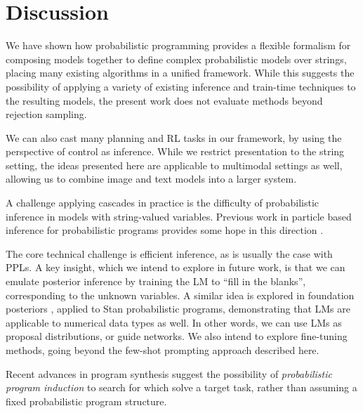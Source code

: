 \section{Discussion}
We have shown how probabilistic programming provides a flexible formalism for composing models together to define complex probabilistic models over strings, placing many existing algorithms in a unified framework. While this suggests the possibility of applying a variety of existing inference and train-time techniques to the resulting models, the present work does not evaluate methods beyond rejection sampling.

We can also cast many planning and RL tasks in our framework, by using the perspective of control as inference.
While we restrict presentation to the string setting, the ideas presented here are applicable to multimodal settings as well, allowing us to combine image and text models into a larger system.

A challenge applying cascades in practice is the difficulty of probabilistic inference in models with string-valued variables. Previous work in particle based inference for probabilistic programs provides some hope in this direction \citep{anglican}.

The core technical challenge is efficient inference, 
as is usually the case with PPLs. A key insight, which we intend
to explore in future work, is that we can emulate posterior
inference by training the LM 
to ``fill in the blanks'', corresponding to the unknown variables.
A similar idea is explored in 
foundation posteriors \citep{foundationposterior}, applied to Stan probabilistic programs, demonstrating that LMs are applicable to numerical data types as well.
In other words, we can use LMs as proposal distributions,
or guide networks.
We also intend to explore fine-tuning methods, going
beyond the few-shot prompting approach described here.

Recent advances in program synthesis suggest the possibility of \textit{probabilistic program induction} \citep{Lake2015,language_of_thought} to search for \cascades which solve a target task, rather than assuming a fixed probabilistic program structure.

